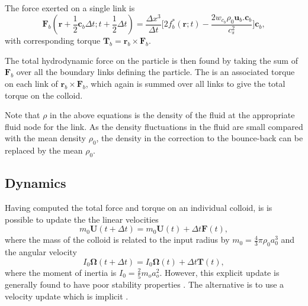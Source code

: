 The force exerted on a
single link is
\begin{equation}
\mathbf{F}_b(\mathbf{r} + {\scriptstyle\frac{1}{2}}\mathbf{c}_b\Delta t;
t + {\scriptstyle\frac{1}{2}}\Delta t) = \frac{\Delta x^3}{\Delta t}
\Big[ 2f_b^\ast(\mathbf{r}; t) - \frac{2w_{c_b}\rho_0 \mathbf{u}_b .
\mathbf{c}_b}{c_s^2} \Big] \mathbf{c}_b,
\label{eq:fb}
\end{equation}
with corresponding torque $\mathbf{T}_b = \mathbf{r}_b \times \mathbf{F}_b$.




The total hydrodynamic force on the particle is then found by taking
the sum of
$\mathbf{F}_b$ over all the boundary links defining the particle.
The is an associated torque on each link of $\mathbf{r}_b\times\mathbf{F}_b$,
which again is summed over all links to give the total torque on the colloid.

Note that $\rho$ in the above equations is the density of the fluid
at the appropriate fluid node for the link. As the density fluctuations
in the fluid are small compared with the mean density $\rho_0$, the
density in the correction to the bounce-back can be replaced by the
mean $\rho_0$.


\subsection{Dynamics}
Having computed the total force and torque on an individual colloid,
is is possible to update the the linear velocities
\begin{equation}
m_0 \mathbf{U}(t + \Delta t) = m_0 \mathbf{U}(t) + \Delta t \mathbf{F} (t),
\end{equation}
where the mass of the colloid is related to the input radius by
$m_0 = {\scriptstyle\frac{4}{3}}\pi\rho_0 a_0^3$ and the angular
velocity
\begin{equation}
I_0 \mathbf{\Omega} (t + \Delta t) = I_0 \mathbf{\Omega}(t) + \Delta t
\mathbf{T}(t),
\end{equation}
where the moment of inertia is $I_0 = {\scriptstyle\frac{2}{5}}m_o a_o^2$.
However, this explicit update is generally found to have poor stability
properties \cite{l94b, nl02}. The alternative is to use a velocity update
which is implicit \cite{heemels,nl02}.



